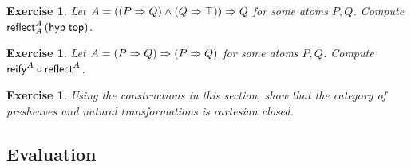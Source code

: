 \documentclass[a4paper]{article}
\newtheorem{exercise}[theorem]{Exercise}
\begin{document}
\begin{exercise}
  Let $A = ((P \imp Q) \land (Q \imp \top)) \imp Q$ for some atoms
  $P,Q$.  Compute $\reflect[A]A{(\hyp \ttop)}$.
\end{exercise}

\begin{exercise}
  Let $A = (P \imp Q) \imp (P \imp Q)$ for some atoms $P,Q$.
  Compute $\treify^A \comp \treflect^A$.
\end{exercise}

\begin{exercise}
  Using the constructions in this section, show that the category of
  presheaves and natural transformations is cartesian closed.
\end{exercise}


\subsection{Evaluation}




\end{document}
